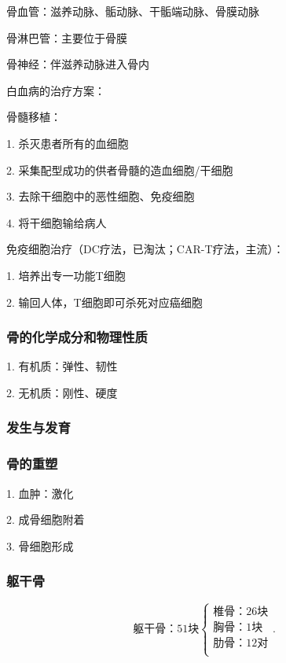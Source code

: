 \begin{notation}
    骨血管：滋养动脉、骺动脉、干骺端动脉、骨膜动脉

    骨淋巴管：主要位于骨膜

    骨神经：伴滋养动脉进入骨内
\end{notation}

\begin{notation}
    白血病的治疗方案：
    
    骨髓移植：

    1. 杀灭患者所有的血细胞

    2. 采集配型成功的供者骨髓的造血细胞/干细胞

    3. 去除干细胞中的恶性细胞、免疫细胞

    4. 将干细胞输给病人

    免疫细胞治疗（DC疗法，已淘汰；CAR-T疗法，主流）：
    
    1. 培养出专一功能T细胞

    2. 输回人体，T细胞即可杀死对应癌细胞
\end{notation}
\subsubsection*{骨的化学成分和物理性质}%
\label{subsub:骨的化学成分和物理性质}
1. 有机质：弹性、韧性

2. 无机质：刚性、硬度

\subsubsection*{发生与发育}%
\label{subsub:发生与发育}

\subsubsection*{骨的重塑}%
\label{subsub:骨的重塑}
1. 血肿：激化

2. 成骨细胞附着

3. 骨细胞形成
\subsubsection{躯干骨}%
\label{subsub:躯干骨}
\[
    \mbox{躯干骨：51块}
    \begin{cases}
        \mbox{椎骨：26块}\\ 
        \mbox{胸骨：1块}\\ 
        \mbox{肋骨：12对}\\ 
    \end{cases}
.\] 

